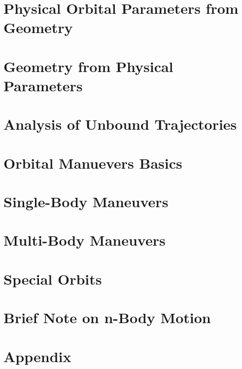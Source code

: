 \documentclass{article}
\begin{document}
\pagebreak
\section{Physical Orbital Parameters from Geometry}\label{sec:Orbital Parameters from Geometry}


\pagebreak
\section{Geometry from Physical Parameters}\label{sec:Geometry from Physical Parameters}


\pagebreak
\section{Analysis of Unbound Trajectories}\label{sec:Special Trajectories}


\pagebreak
\section{Orbital Manuevers Basics}\label{sec:Manuevers Basics}


\pagebreak
\section{Single-Body Maneuvers}\label{sec:Manuevers}


\pagebreak
\section{Multi-Body Maneuvers}\label{sec:Multibody Maneuevers}


\pagebreak
\section{Special Orbits}\label{sec:Special Orbits}


\pagebreak
\section{Brief Note on n-Body Motion}\label{sec:N Body Motion}


\pagebreak
\section{Appendix}\label{sec:Appendix}



\end{document}
